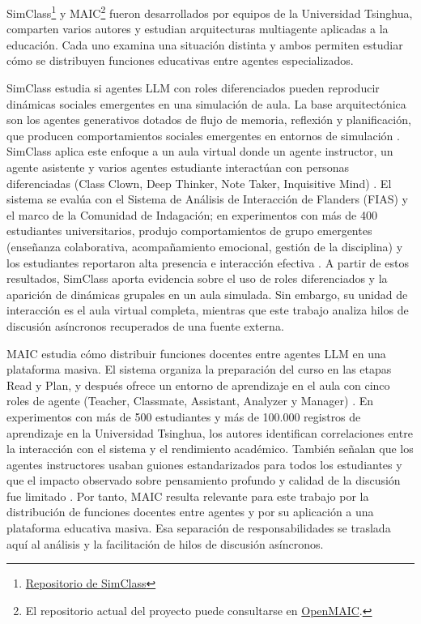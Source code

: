 SimClass\footnote{\href{https://github.com/THU-MAIC/SimClass}{Repositorio de SimClass}} y MAIC\footnote{El repositorio actual del proyecto puede consultarse en \href{https://github.com/THU-MAIC/OpenMAIC}{OpenMAIC}.} fueron desarrollados por equipos de la Universidad Tsinghua, comparten varios autores y estudian arquitecturas multiagente aplicadas a la educación. Cada uno examina una situación distinta y ambos permiten estudiar cómo se distribuyen funciones educativas entre agentes especializados.

SimClass estudia si agentes LLM con roles diferenciados pueden reproducir dinámicas sociales emergentes en una simulación de aula. La base arquitectónica son los agentes generativos dotados de flujo de memoria, reflexión y planificación, que producen comportamientos sociales emergentes en entornos de simulación \parencite{ParkEtAl2023}. SimClass aplica este enfoque a un aula virtual donde un agente instructor, un agente asistente y varios agentes estudiante interactúan con personas diferenciadas (Class Clown, Deep Thinker, Note Taker, Inquisitive Mind) \parencite{ZhangEtAl2024simclass}. El sistema se evalúa con el Sistema de Análisis de Interacción de Flanders (FIAS) y el marco de la Comunidad de Indagación; en experimentos con más de 400 estudiantes universitarios, produjo comportamientos de grupo emergentes (enseñanza colaborativa, acompañamiento emocional, gestión de la disciplina) y los estudiantes reportaron alta presencia e interacción efectiva \parencite{ZhangEtAl2024simclass}. A partir de estos resultados, SimClass aporta evidencia sobre el uso de roles diferenciados y la aparición de dinámicas grupales en un aula simulada. Sin embargo, su unidad de interacción es el aula virtual completa, mientras que este trabajo analiza hilos de discusión asíncronos recuperados de una fuente externa.

MAIC estudia cómo distribuir funciones docentes entre agentes LLM en una plataforma masiva. El sistema organiza la preparación del curso en las etapas Read y Plan, y después ofrece un entorno de aprendizaje en el aula con cinco roles de agente (Teacher, Classmate, Assistant, Analyzer y Manager) \parencite{YuEtAl2024maic}. En experimentos con más de 500 estudiantes y más de 100.000 registros de aprendizaje en la Universidad Tsinghua, los autores identifican correlaciones entre la interacción con el sistema y el rendimiento académico. También señalan que los agentes instructores usaban guiones estandarizados para todos los estudiantes y que el impacto observado sobre pensamiento profundo y calidad de la discusión fue limitado \parencite{YuEtAl2024maic}. Por tanto, MAIC resulta relevante para este trabajo por la distribución de funciones docentes entre agentes y por su aplicación a una plataforma educativa masiva. Esa separación de responsabilidades se traslada aquí al análisis y la facilitación de hilos de discusión asíncronos.


